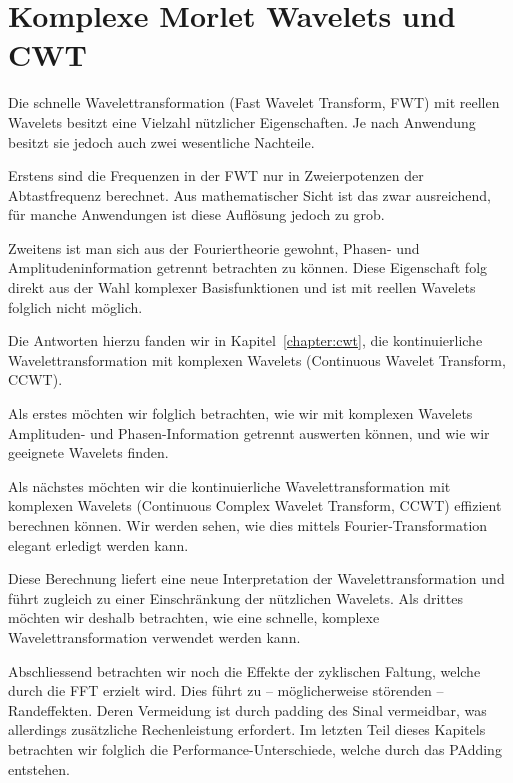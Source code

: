 %
%
%
\chapter{Komplexe Morlet Wavelets und CWT\label{chapter:thema}}
\begin{refsection}

Die schnelle Wavelettransformation (Fast Wavelet Transform, FWT) mit reellen Wavelets besitzt eine Vielzahl nützlicher Eigenschaften.
Je nach Anwendung besitzt sie jedoch auch zwei wesentliche Nachteile.

Erstens sind die Frequenzen in der FWT nur in Zweierpotenzen der Abtastfrequenz berechnet.
Aus mathematischer Sicht ist das zwar ausreichend, für manche Anwendungen ist diese Auflösung jedoch zu grob.

Zweitens ist man sich aus der Fouriertheorie gewohnt, Phasen- und Amplitudeninformation getrennt betrachten zu können.
Diese Eigenschaft folg direkt aus der Wahl komplexer Basisfunktionen und ist mit reellen Wavelets folglich nicht möglich.

Die Antworten hierzu fanden wir in Kapitel~\ref{chapter:cwt}, die kontinuierliche Wavelettransformation mit komplexen Wavelets (Continuous Wavelet Transform, CCWT).

Als erstes möchten wir folglich betrachten, wie wir mit komplexen Wavelets Amplituden- und Phasen-Information getrennt auswerten können, und wie wir geeignete Wavelets finden.

Als nächstes möchten wir die kontinuierliche Wavelettransformation mit komplexen Wavelets (Continuous Complex Wavelet Transform, CCWT) effizient berechnen können.
Wir werden sehen, wie dies mittels Fourier-Transformation elegant erledigt werden kann.

Diese Berechnung liefert eine neue Interpretation der Wavelettransformation und führt zugleich zu einer Einschränkung der nützlichen Wavelets.
Als drittes möchten wir deshalb betrachten, wie eine schnelle, komplexe Wavelettransformation verwendet werden kann.

Abschliessend betrachten wir noch die Effekte der zyklischen Faltung, welche durch die FFT erzielt wird.
Dies führt zu -- möglicherweise störenden -- Randeffekten.
Deren Vermeidung ist durch padding des Sinal vermeidbar, was allerdings zusätzliche Rechenleistung erfordert.
Im letzten Teil dieses Kapitels betrachten wir folglich die Performance-Unterschiede, welche durch das PAdding entstehen.



\end{refsection}
